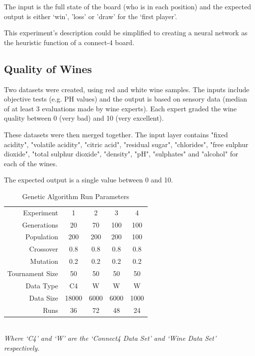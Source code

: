 \documentclass[journal]{IEEEtran}
\begin{document}
   The input is the full state of the board (who is in each position) and the expected output
   is either `win', 'loss' or 'draw' for the `first player'.

   This experiment's description could be simplified to creating a neural network as the heuristic
   function of a connect-4 board.

  \subsection{Quality of Wines}
  Two datasets were created, using red and white wine samples.
  The inputs include objective tests (e.g. PH values) and the output is based on sensory data
  (median of at least 3 evaluations made by wine experts). Each expert graded the wine quality
  between 0 (very bad) and 10 (very excellent).

  These datasets were then merged together. The input layer contains
  "fixed acidity", "volatile acidity", "citric acid", "residual sugar", "chlorides",
  "free sulphur dioxide", "total sulphur dioxide", "density", "pH", "sulphates" and "alcohol"
  for each of the wines.

  The expected output is a single value between 0 and 10.\cite{wine}

  \begin{table}[here]
    \renewcommand{\arraystretch}{1.3}
    \caption{Genetic Algorithm Run Parameters}
    \label{E2}
    \centering
    \begin{tabular}{r|cccc}
  Experiment      & 1     & 2     & 3     & 4 \\
  Generations     & 20    & 70    & 100   & 100 \\
  Population      & 200   & 200   & 200   & 100 \\
  Crossover       & 0.8   & 0.8   & 0.8   & 0.8 \\
  Mutation        & 0.2   & 0.2   & 0.2   & 0.2 \\
  Tournament Size & 50    & 50    & 50    & 50 \\
  Data Type       & C4    & W     & W     & W \\
  Data Size       & 18000 & 6000  & 6000  & 1000 \\
  Runs            & 36    & 72    & 48    & 24 \\
    \end{tabular} \\
  \textit{Where `C4' and `W' are the `Connect4 Data Set' and `Wine Data Set' respectively.}
   \end{table}
\end{document}
